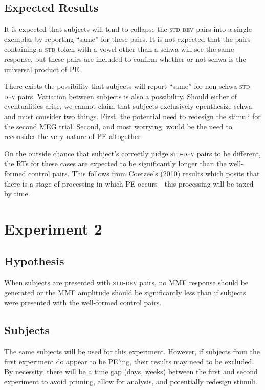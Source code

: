 \documentclass[jou,apacite]{apa6}
\begin{document}
    \subsection{Expected Results}
    It is expected that subjects will tend to collapse the \textsc{std-dev} pairs into a single exemplar by reporting “same” for these pairs. It is not expected that the pairs containing a \textsc{std} token with a vowel other than a schwa will see the same response, but these pairs are included to confirm whether or not schwa is the universal product of PE.

    There exists the possibility that subjects will report “same” for non-schwa \textsc{std-dev} pairs. Variation between subjects is also a possibility. Should either of eventualities arise, we cannot claim that subjects exclusively epenthesize schwa and must consider two things. First, the potential need to redesign the stimuli for the second MEG trial. Second, and most worrying, would be the need to reconsider the very nature of PE altogether

    On the outside chance that subject’s correctly judge \textsc{std-dev} pairs to be different, the RTs for these cases are expected to be significantly longer than the well-formed control pairs. This follows from Coetzee’s (2010) results which posits that there is a stage of processing in which PE occurs—this processing will be taxed by time.

\section{Experiment 2}

    \subsection{Hypothesis}
    When subjects are presented with \textsc{std-dev} pairs, no MMF response should be generated or the MMF amplitude should be significantly less than if subjects were presented with the well-formed control pairs.

    \subsection{Subjects}
    The same subjects will be used for this experiment. However, if subjects from the first experiment do appear to be PE’ing, their results may need to be excluded. By necessity, there will be a time gap (days, weeks) between the first and second experiment to avoid priming, allow for analysis, and potentially redesign stimuli.
\end{document}
